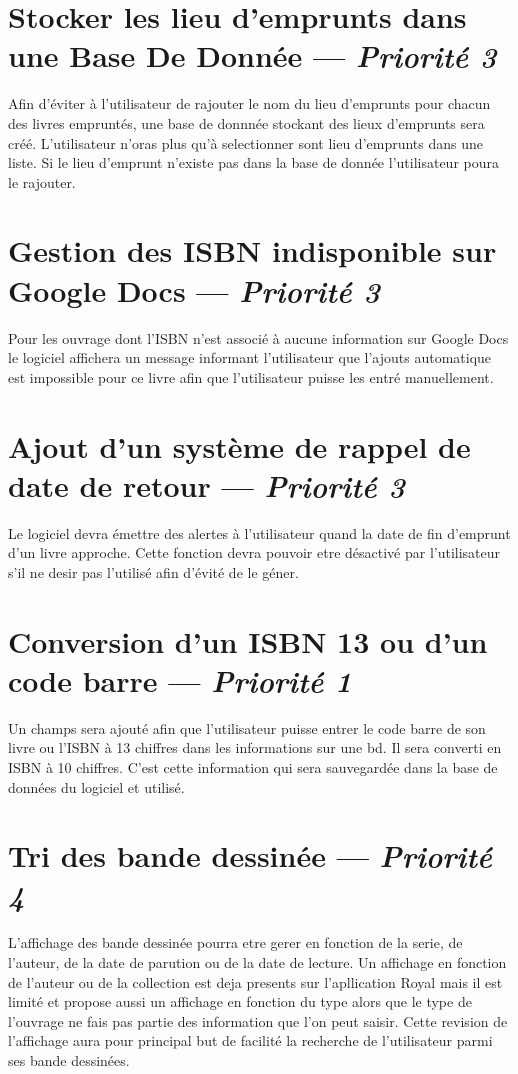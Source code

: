\section[Stocker les lieu d'emprunts dans une Base De Donnée]{Stocker les lieu d'emprunts dans une Base De Donnée — \emph{Priorité 3}}
Afin d'éviter à l'utilisateur de rajouter le nom du lieu d'emprunts pour chacun des livres empruntés, une base de donnnée stockant des lieux d'emprunts sera créé. L'utilisateur n'oras plus qu'à selectionner sont lieu d'emprunts dans une liste. Si le lieu d'emprunt n'existe pas dans la base de donnée l'utilisateur poura le rajouter.

\section[Gestion des ISBN indisponible sur Google Docs]{Gestion des ISBN indisponible sur Google Docs — \emph{Priorité 3}}
Pour les ouvrage dont l'ISBN n'est associé à aucune information sur Google Docs le logiciel affichera un message informant l'utilisateur que l'ajouts automatique est impossible pour ce livre afin que l'utilisateur puisse les entré manuellement.   

\section[Ajout d'un système de rappel de date de retour]{Ajout d'un système de rappel de date de retour — \emph{Priorité 3}}
Le logiciel devra émettre des alertes à l'utilisateur quand la date de fin d'emprunt d'un livre approche. Cette fonction devra pouvoir etre désactivé par l'utilisateur s'il ne desir pas l'utilisé afin d'évité de le géner.

\section[Conversion d'un ISBN 13 ou code barre]{Conversion d'un ISBN 13 ou d'un code barre — \emph{Priorité 1}}
Un champs sera ajouté afin que l'utilisateur puisse entrer le code barre de son livre ou l'ISBN à 13 chiffres dans les informations sur une bd. Il sera converti en ISBN à 10 chiffres. C'est cette information qui sera sauvegardée dans la base de données du logiciel et utilisé.


\section[Tri des bande dessinée]{Tri des bande dessinée — \emph{Priorité 4}}
L'affichage des bande dessinée pourra etre gerer en fonction de la serie, de l'auteur, de la date de parution ou de la date de lecture. Un affichage en fonction de l'auteur ou de la collection est deja presents sur l'apllication Royal mais il est limité et propose aussi un affichage en fonction du type alors que le type de l'ouvrage ne fais pas partie des information que l'on peut saisir. Cette revision de l'affichage aura pour principal but de facilité la recherche de l'utilisateur parmi ses bande dessinées.

